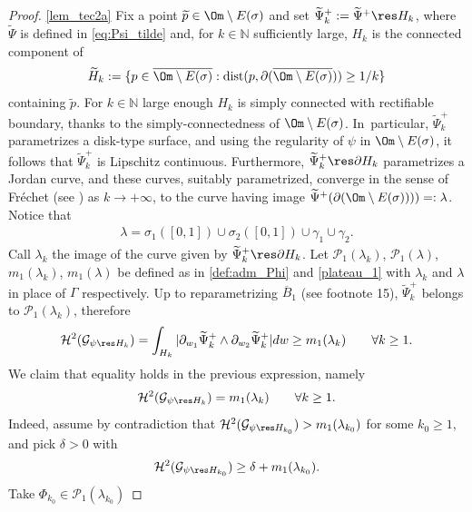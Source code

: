 \skpt
\begin{proof}
\ref{lem_tec2a}
Fix a point $\widetilde p\in \Om\setminus E(\sigma)$ and set $\widetilde \Psi^+_k:=\widetilde\Psi^+\res H_k$,
where $\widetilde \Psi$ is defined in \eqref{eq:Psi_tilde}
and, for $k\in \mathbb N$ sufficiently large, $H_k$ is the
connected component of
\[
\widetilde H_k:=\{p\in \overline{\Om\setminus E(\sigma)}:\textup{dist}(p,\partial(\overline{\Om\setminus E(\sigma)}) )\geq 1/k\}
\]
containing $\widetilde p$.
For $k \in \mathbb N$ large enough $H_k$ is
simply connected with rectifiable boundary, thanks to the simply-connectedness of $ \Om\setminus E(\sigma)$.
In~particular, $\widetilde \Psi^+_k$ parametrizes a disk-type surface, and
using the regularity of $ \psi$ in ${\Om\setminus E(\sigma)}$,
it follows that $\widetilde \Psi^+_k$ is Lipschitz continuous.
Furthermore,
$\widetilde \Psi^+_k\res \partial H_k$
parametrizes a Jordan curve,
and these curves, suitably parametrized,
converge in the sense of Fréchet (see \cite[Th.\,4, \S 4.3]{DHS})
as $k\to +\infty$, to the curve having image
$\widetilde \Psi^+(\partial ({\Om\setminus E(\sigma)}) ) )=:\lambda$.
Notice that
\begin{align}\label{lambda}
\lambda=\sigma_1([0,1])\cup\sigma_2([0,1])\cup\gamma_1\cup \gamma_2.
\end{align}
Call $\lambda_k$ the image of the curve given by
$\widetilde \Psi^+_k\res \partial H_k$.
Let $\mathcal{P}_1(\lambda_k)$, $\mathcal{P}_1(\lambda)$, $m_1(\lambda_k)$, $m_1(\lambda)$ be defined as in \eqref{def:adm_Phi} and \eqref{plateau_1} with $\lambda_k$ and $\lambda$ in place of $\Gamma$ respectively.
Up to reparametrizing $\overline B_1$ (see footnote 15),
$\widetilde\Psi^+_k$ belongs to $\mathcal{P}_1(\lambda_k)$, therefore
\[
\mathcal H^2( \mathcal G_{\psi\res H_{k}})=\int_{H_k}|\partial_{w_1}\widetilde \Psi_k^+\wedge \partial_{w_2}\widetilde \Psi_k^+ |dw\geq m_1(\lambda_k)\qquad\forall k\geq1.
\]
We claim that equality holds in the previous expression, namely
\begin{align}\label{claim_speranza}
\mathcal H^2( \mathcal G_{\psi\res H_k})=m_1(\lambda_k)\qquad \forall k\geq1.
\end{align}
Indeed, assume by contradiction that $\mathcal H^2( \mathcal G_{\psi\res H_{k_0}})>m_1(\lambda_{k_0})$ for some $k_0\geq1$,
and pick $\delta>0$ with
\begin{equation}\label{eq:absurd}
\mathcal H^2( \mathcal G_{\psi\res H_{k_0}})\geq \delta+
m_1(\lambda_{k_0}).
\end{equation}
Take $\Phi_{k_0}\in \mathcal{P}_1(\lambda_{k_0})$

\end{proof}
